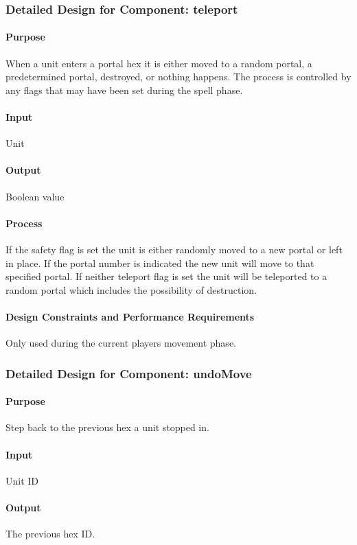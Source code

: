 \documentclass[12pt,a4paper,titlepage]{article}
\begin{document}
\subsubsection{Detailed Design for Component: teleport}
\paragraph{Purpose} When a unit enters a portal hex it is either moved to a random portal, a predetermined portal, destroyed, or nothing happens. The process is controlled by any flags that may have been set during the spell phase.
\paragraph{Input} Unit
\paragraph{Output} Boolean value
\paragraph{Process} If the safety flag is set the unit is either randomly moved to a new portal or left in place. If the portal number is indicated the new unit will move to that specified portal. If neither teleport flag is set the unit will be teleported to a random portal which includes the possibility of destruction.
\paragraph{Design Constraints and Performance Requirements} Only used during the current players movement phase.

\subsubsection{Detailed Design for Component: undoMove}
\paragraph{Purpose} Step back to the previous hex a unit stopped in.
\paragraph{Input} Unit ID
\paragraph{Output} The previous hex ID.
\end{document}
